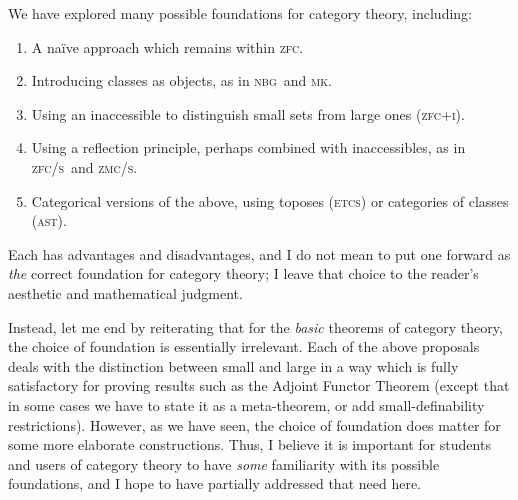 \documentclass[12pt]{amsart}
\def\zfc{\textsc{zfc}}
\def\zfci{\textsc{zfc+i}}
\def\zfcs{\textsc{zfc/s}}
\def\zmcs{\textsc{zmc/s}}
\def\nbg{\textsc{nbg}}
\def\mk{\textsc{mk}}
\def\etcs{\textsc{etcs}}
\def\ast{\textsc{ast}}
\begin{document}
We have explored many possible foundations for category theory, including:
\begin{enumerate}[(1)]
\item A na\"ive approach which remains within \zfc.
\item Introducing classes as objects, as in \nbg\ and \mk.
\item Using an inaccessible to distinguish small sets from large ones (\zfci).
\item Using a reflection principle, perhaps combined with
  inaccessibles, as in \zfcs\ and \zmcs.
\item Categorical versions of the above, using toposes (\etcs) or
  categories of classes (\ast).
\end{enumerate}
Each has advantages and disadvantages, and I do not mean to put one
forward as \emph{the} correct foundation for category theory; I leave
that choice to the reader's aesthetic and mathematical judgment.

Instead, let me end by reiterating that for the \emph{basic} theorems
of category theory, the choice of foundation is essentially
irrelevant.  Each of the above proposals deals with the distinction
between small and large in a way which is fully satisfactory for
proving results such as the Adjoint Functor Theorem (except that in
some cases we have to state it as a meta-theorem, or add
small-definability restrictions).  However, as we have seen, the
choice of foundation does matter for some more elaborate
constructions.  Thus, I believe it is important for students and users
of category theory to have \emph{some} familiarity with its possible
foundations, and I hope to have partially addressed that need here.




\end{document}
